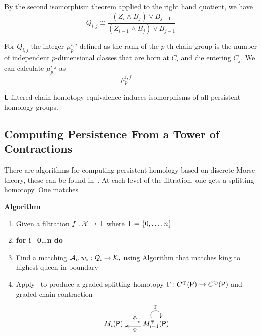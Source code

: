 By the second isomorphism theorem applied to the right hand quotient, we have 
\[
Q_{i,j} \cong \frac{(Z_i\wedge B_j)\vee B_{j-1} } {(Z_{i-1}\wedge B_j)\vee B_{j-1}}
\]


For $Q_{i,j}$ the integer $\mu^{i,j}_p$ defined as the rank of the $p$-th chain group is the number of independent $p$-dimensional classes that are born at $C_i$ and die entering $C_j$.  We can calculate $\mu_p^{i,j}$ as 
\[
\mu_p^{i,j} = 
\]


\begin{prop}
${\mathsf L}$-filtered chain homotopy equivalence induces isomorphisms of all persistent homology groups.
\end{prop}

\subsection{Computing Persistence From a Tower of Contractions}


There are algorithms for computing persistent homology based on discrete Morse theory, these can be found in~\cite{pawel,real}.  At each level of the filtration, one gets a splitting homotopy.  One matches 

{\bf Algorithm}
\begin{enumerate}
\item Given a filtration $f:{\mathcal X}\to {\mathsf T}$ where ${\mathsf T} = \{0,\ldots, n\}$
\item {\bf for i=0\ldots n do}
\item Find a matching ${\mathcal A}_i,w_i:{\mathcal Q}_i\to {\mathcal K}_i$ using Algorithm that matches king to highest queen in boundary
\item Apply~\cite[Algorithm 3.12]{focm} to produce a graded splitting homotopy $\Gamma:C^\oplus({\mathsf P})\to C^\oplus({\mathsf P})$ and graded chain contraction
\[
\xymatrixrowsep{0.03in}
\xymatrixcolsep{0.3in}
\xymatrix{
M_i(\sP)  \ar[r]<3pt>^{\Phi} & \ar[l]<3pt>^{\Psi} M_{i-1}^\oplus(\sP) \ar@(ul,ur)^{\Gamma}
}
\]

\end{enumerate}


